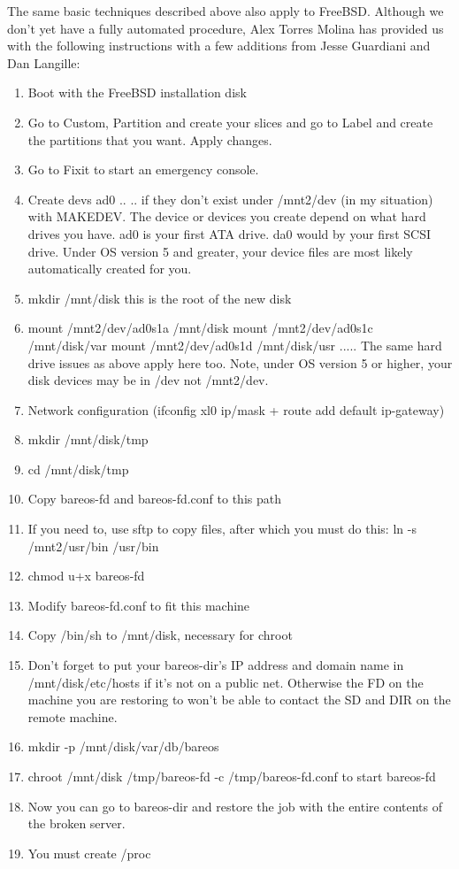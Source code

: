 The same basic techniques described above also apply to FreeBSD. Although we
don't yet have a fully automated procedure, Alex Torres Molina has provided us
with the following instructions with a few additions from Jesse Guardiani and
Dan Langille:

\begin{enumerate}
\item Boot with the FreeBSD installation disk
\item Go to Custom, Partition and create your slices and go to Label and
   create the partitions that you want. Apply changes.
\item Go to Fixit to start an emergency console.
\item Create devs ad0 .. .. if they don't exist under /mnt2/dev (in my  situation)
   with MAKEDEV. The device or devices you  create depend on what hard drives you
   have. ad0 is your  first ATA drive. da0 would by your first SCSI drive.  Under
OS version 5 and greater, your device files are  most likely automatically
created for you.
\item mkdir /mnt/disk
   this is the root of the new disk
\item mount /mnt2/dev/ad0s1a /mnt/disk
   mount /mnt2/dev/ad0s1c /mnt/disk/var
   mount /mnt2/dev/ad0s1d /mnt/disk/usr
.....
The same hard drive issues as above apply here too.  Note, under OS version 5
or higher, your disk devices may  be in /dev not /mnt2/dev.
\item Network configuration (ifconfig xl0 ip/mask + route add default
   ip-gateway)
\item mkdir /mnt/disk/tmp
\item cd /mnt/disk/tmp
\item Copy bareos-fd and bareos-fd.conf to this path
\item If you need to, use sftp to copy files, after which you must do this:
   ln -s /mnt2/usr/bin /usr/bin
\item chmod u+x bareos-fd
\item Modify bareos-fd.conf to fit this machine
\item Copy /bin/sh to /mnt/disk, necessary for chroot
\item Don't forget to put your bareos-dir's IP address and domain  name in
   /mnt/disk/etc/hosts if it's not on a public net.  Otherwise the FD on the
   machine you are restoring to  won't be able to contact the SD and DIR on the
remote machine.
\item mkdir -p /mnt/disk/var/db/bareos
\item chroot /mnt/disk /tmp/bareos-fd -c /tmp/bareos-fd.conf
   to start bareos-fd
\item Now you can go to bareos-dir and restore the job with the entire
   contents of the broken server.
\item You must create /proc
\end{enumerate}

